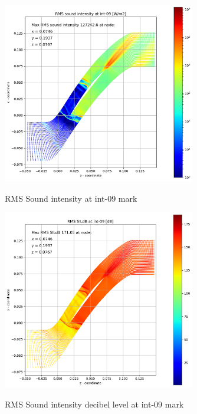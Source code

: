 \begin{figure}[ht]
  \centering
  \includegraphics[width=0.75\textwidth]{Figures/int-09-rms-sil.png} \label{int-09-rms-sil}
  \caption{RMS Sound intensity at int-09 mark}
  
  \vspace*{\floatsep}%

  \includegraphics[width=0.75\textwidth]{Figures/int-09-rms-sildb.png} \label{int-09-rms-sildb}
  \caption{RMS Sound intensity decibel level at int-09 mark}
\end{figure}


